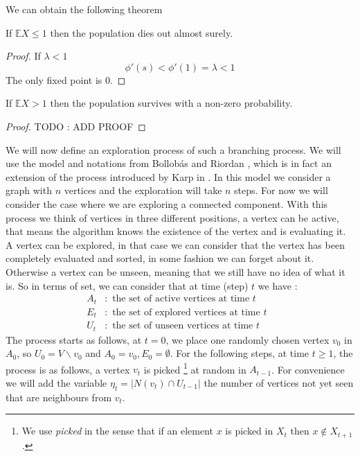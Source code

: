 We can obtain the following theorem
\begin{theorem}
	If $\mathbb{E}X \leq 1$ then the population dies out almost surely.
\end{theorem}
\begin{proof}
    If $\lambda < 1$
	\begin{equation}
	    \phi'(s) < \phi'(1) = \lambda < 1
	\end{equation}
	The only fixed point is 0.
\end{proof}
\begin{theorem}
	If $\mathbb{E}X > 1$ then the population survives with a non-zero probability.
\end{theorem}
\begin{proof}
	TODO : ADD PROOF
\end{proof}
We will now define an exploration process of such a branching process. We will use the model and notations from Bollob\'as and Riordan \cite{BollobRiordan12}, which is in fact an extension of the process introduced by Karp in \cite{Karp90}.
In this model we consider a graph with $n$ vertices and the exploration will take $n$ steps. 
For now we will consider the case where we are exploring a connected component.
With this process we think of vertices in three different positions, a vertex can be active, that means the algorithm knows the existence of the vertex and is evaluating it.
A vertex can be explored, in that case we can consider that the vertex has been completely evaluated and sorted, in some fashion we can forget about it.
Otherwise a vertex can be unseen, meaning that we still have no idea of what it is.
So in terms of set, we can consider that at time (step) $t$ we have :
\begin{align}
	A_t&: \text{ the set of active vertices at time $t$ } \\
	E_t&: \text{ the set of explored vertices at time $t$ } \\
	U_t&: \text{ the set of unseen vertices at time $t$ } 
\end{align}
The process starts as follows, at $t = 0$, we place one randomly chosen vertex $v_0$ in $A_0$, so $U_0 = V\backslash v_0$ and $A_0 = v_0, E_0=\emptyset $.
\newline
For the following steps, at time $t \geq 1$, the process is as follows, a vertex $v_t$ is picked \footnote{We use \emph{picked} in the sense that if an element $x$ is picked in  $X_{t}$ then $x \not\in X_{t+1}$.} at random in $A_{t-1}$. 
For convenience we will add the variable $\eta_t = |N(v_t) \cap U_{t-1}|$ the number of vertices not yet seen that are neighbours from $v_t$.
